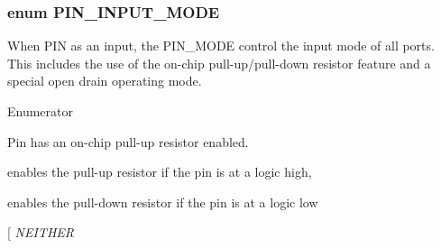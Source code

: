 \hypertarget{group___peripheral_ga16ce6180d8bb2eb23a7df8f8923ea581}{
\subsubsection[{P\-I\-N\-\_\-\-I\-N\-P\-U\-T\-\_\-\-M\-O\-D\-E}]{\setlength{\rightskip}{0pt plus 5cm}enum {\bf P\-I\-N\-\_\-\-I\-N\-P\-U\-T\-\_\-\-M\-O\-D\-E}}}\label{group___peripheral_ga16ce6180d8bb2eb23a7df8f8923ea581}
When P\-I\-N as an input, the P\-I\-N\-\_\-\-M\-O\-D\-E control the input mode of all ports. This includes the use of the on-\/chip pull-\/up/pull-\/down resistor feature and a special open drain operating mode. \begin{Desc}
\item[Enumerator]\par
\begin{description}
\item[{\em 
\hypertarget{group___peripheral_gga16ce6180d8bb2eb23a7df8f8923ea581a781a7f23ae9b0dbdc6edfdcfd3be75df}{I\-N\-T\-E\-R\-N\-A\-L\-\_\-\-P\-U\-L\-L\-\_\-\-U\-P}\label{group___peripheral_gga16ce6180d8bb2eb23a7df8f8923ea581a781a7f23ae9b0dbdc6edfdcfd3be75df}
}]Pin has an on-\/chip pull-\/up resistor enabled. \item[{\em 
\hypertarget{group___peripheral_gga16ce6180d8bb2eb23a7df8f8923ea581a415b70b8108c51e396b88eeeaa0ffb1a}{R\-E\-P\-E\-A\-T\-E\-R}\label{group___peripheral_gga16ce6180d8bb2eb23a7df8f8923ea581a415b70b8108c51e396b88eeeaa0ffb1a}
}]enables the pull-\/up resistor if the pin is at a logic high, \par
 enables the pull-\/down resistor if the pin is at a logic low \item[{\em 
\hypertarget{group___peripheral_gga16ce6180d8bb2eb23a7df8f8923ea581a013572cb02b52b1022858df73a528a08}{N\-E\-I\-T\-H\-E\-R}\label{group___peripheral_gga16ce6180d8bb2eb23a7df8f8923ea581a013572cb02b52b1022858df73a528a08}
}
\end{description}
\end{Desc}

